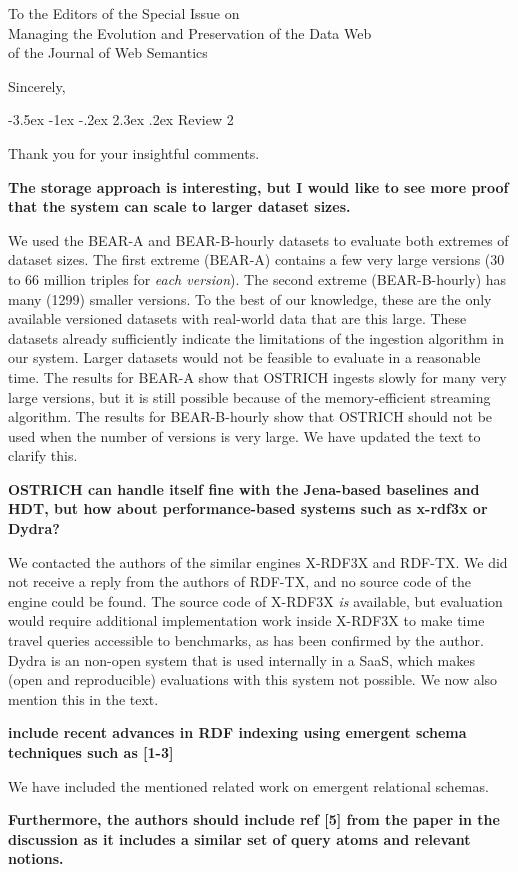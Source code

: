 \documentclass{letter}
\makeatletter
\newcounter{section}
\newcommand\section{\@startsection {section}{1}{\z@}%
                                   {-3.5ex \@plus -1ex \@minus -.2ex}%
                                   {2.3ex \@plus.2ex}%
                                   {\normalfont\Large\bfseries}}
\makeatother
\begin{document}
\begin{letter}{To the Editors of the Special Issue on\\Managing the Evolution and Preservation of the Data Web\\of the Journal of Web Semantics}
\closing{Sincerely,}

\pagebreak
\section{Review 2}

Thank you for your insightful comments.

\textbf{The storage approach is interesting, but I would like to see more proof that the system can scale to larger dataset sizes.}

We used the BEAR-A and BEAR-B-hourly datasets to evaluate both extremes of dataset sizes.
The first extreme (BEAR-A) contains a few very large versions (30 to 66 million triples for \emph{each version}).
The second extreme (BEAR-B-hourly) has many (1299) smaller versions.
To the best of our knowledge, these are the only available versioned datasets with real-world data
that are this large.
These datasets already sufficiently indicate the limitations of the ingestion algorithm in our system.
Larger datasets would not be feasible to evaluate in a reasonable time.
The results for BEAR-A show that OSTRICH ingests slowly for many very large versions,
but it is still possible because of the memory-efficient streaming algorithm.
The results for BEAR-B-hourly show that OSTRICH should not be used when the number of versions is very large.
We have updated the text to clarify this.

\textbf{OSTRICH can handle itself fine with the Jena-based baselines and HDT, but how about performance-based systems such as x-rdf3x or Dydra?}

We contacted the authors of the similar engines X-RDF3X and RDF-TX.
We did not receive a reply from the authors of RDF-TX, and no source code of the engine could be found.
The source code of X-RDF3X \emph{is} available, but evaluation would require additional implementation work inside X-RDF3X
to make time travel queries accessible to benchmarks, as has been confirmed by the author.
Dydra is an non-open system that is used internally in a SaaS, which makes (open and reproducible) evaluations with this system not possible.
We now also mention this in the text.

\textbf{include recent advances in RDF indexing using emergent schema techniques such as [1-3]}

We have included the mentioned related work on emergent relational schemas.

\textbf{Furthermore, the authors should include ref [5] from the paper in the discussion as it includes a similar set of query atoms and relevant notions.}


\end{letter}
\end{document}
